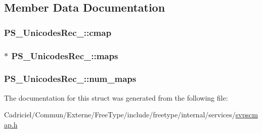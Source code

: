 \subsection{Member Data Documentation}
\hypertarget{struct_p_s___unicodes_rec___a4c3e28cb86c8a7039107437dcf995da7}{
\subsubsection[{cmap}]{ P\-S\-\_\-\-Unicodes\-Rec\-\_\-\-::cmap}}\label{struct_p_s___unicodes_rec___a4c3e28cb86c8a7039107437dcf995da7}
\hypertarget{struct_p_s___unicodes_rec___abd0ff1abe19a2a6a838b631ec81d22cd}{
\subsubsection[{maps}]{$\ast$ P\-S\-\_\-\-Unicodes\-Rec\-\_\-\-::maps}}\label{struct_p_s___unicodes_rec___abd0ff1abe19a2a6a838b631ec81d22cd}
\hypertarget{struct_p_s___unicodes_rec___abbc3617f13363ddcf851ee229752b08d}{
\subsubsection[{num\-\_\-maps}]{ P\-S\-\_\-\-Unicodes\-Rec\-\_\-\-::num\-\_\-maps}}\label{struct_p_s___unicodes_rec___abbc3617f13363ddcf851ee229752b08d}


The documentation for this struct was generated from the following file\-:\begin{DoxyCompactItemize}
\item 
Cadriciel/\-Commun/\-Externe/\-Free\-Type/include/freetype/internal/services/\hyperlink{svpscmap_8h}{svpscmap.\-h}\end{DoxyCompactItemize}
